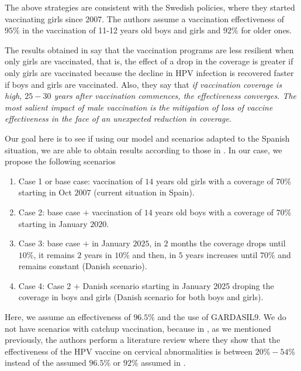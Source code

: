 The above strategies are consistent with the Swedish policies, where they started vaccinating girls since 2007. The authors assume a vaccination effectiveness of $95\%$ in the vaccination of 11-12 years old boys and girls and $92\%$ for older ones.

The results obtained in \cite{Elfstrm2015} say that the vaccination programs are less resilient when only girls are vaccinated, that is, the effect of a drop in the coverage is greater if only girls are vaccinated because the decline in HPV infection is recovered faster if boys and girls are vaccinated. Also, they say that \textit{if vaccination coverage is high, $25-30$ years after vaccination commences, the effectiveness converges. The most salient impact of male vaccination is the mitigation of loss of vaccine effectiveness in the face of an unexpected reduction in coverage}.

Our goal here is to see if using our model and scenarios adapted to the Spanish situation, we are able to obtain results according to those in \cite{Elfstrm2015}. In our case, we propose the following scenarios

\begin{enumerate}
	\item Case 1 or base case: vaccination of $14$ years old girls with a coverage of $70\%$ starting in Oct $2007$ (current situation in Spain).
	\item Case 2: base case $+$ vaccination of $14$ years old boys with a coverage of $70\%$ starting in January $2020$.
	\item Case 3: base case $+$ in January $2025$, in $2$ months the coverage drops until $10\%$, it remains $2$ years in $10\%$ and then, in $5$ years increases until $70\%$ and remains constant (Danish scenario).
	\item Case 4: Case 2 $+$ Danish scenario starting in January 2025 droping the coverage in boys and girls (Danish scenario for both boys and girls).
\end{enumerate}

Here, we assume an effectiveness of $96.5\%$ and the use of GARDASIL9. We do not have scenarios with catchup vaccination, because in \cite{Skufca}, as we mentioned previously, the authors perform a literature review where they show that the effectiveness of the HPV vaccine on cervical abnormalities is between $20\% - 54\%$ instead of the assumed $96.5\%$ or $92\%$ assumed in \cite{Elfstrm2015}. 


